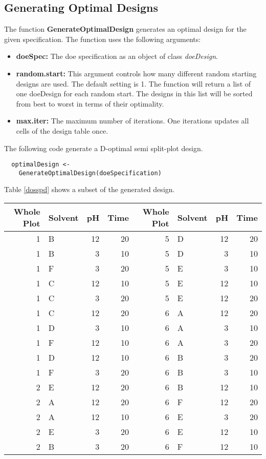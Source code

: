 \subsection{Generating Optimal Designs}

The function \textbf{GenerateOptimalDesign} generates an optimal design for the given specification. The function uses the following arguments:

\begin{itemize}
\item \textbf{doeSpec:} The doe specification as an object of class \textit{doeDesign}.
\item \textbf{random.start:} This argument controls how many different random starting designs are used. The default setting is 1. The function will return a list of one doeDesign for each random start. The designs in this list will be sorted from best to worst in terms of their optimality.
\item \textbf{max.iter:} The maximum number of iterations. One iterations updates all cells of the design table once. 
\end{itemize}

The following code generate a D-optimal semi split-plot design.

\begin{verbatim}
  optimalDesign <- 
    GenerateOptimalDesign(doeSpecification)
\end{verbatim}

Table \ref{dosspd} shows a subset of the generated design.

\begin{table*}[!h]
\centering
\begin{tabular}{rlrr|rlrr}
  \hline
Whole Plot & Solvent & pH & Time & Whole Plot & Solvent & pH & Time \\ 
  \hline
  \hline
1 & B & 12 & 20 &   5 & D & 12 & 20 \\ 
1 & B & 3 & 10 &   5 & D & 3 & 10 \\ 
1 & F & 3 & 20 &   5 & E & 3 & 10 \\ 
 1 & C & 12 & 10 &   5 & E & 12 & 10 \\ 
 1 & C & 3 & 20 &   5 & E & 12 & 20 \\ 
 1 & C & 12 & 20 &   6 & A & 12 & 20 \\ 
 1 & D & 3 & 10 &   6 & A & 3 & 10 \\ 
 1 & F & 12 & 10 &   6 & A & 3 & 20 \\ 
 1 & D & 12 & 10 &   6 & B & 3 & 20 \\ 
 1 & F & 3 & 20 &   6 & B & 3 & 10 \\ 
 2 & E & 12 & 20 &   6 & B & 12 & 10 \\ 
 2 & A & 12 & 20 &   6 & F & 12 & 20 \\ 
 2 & A & 12 & 10 &   6 & E & 3 & 20 \\ 
 2 & E & 3 & 20 &   6 & E & 12 & 10 \\ 
 2 & B & 3 & 20 &   6 & F & 12 & 10 \\ 
   \hline
\end{tabular}
\caption{Part of the Semi Split Plot Design} \label{dosspd}
\end{table*}